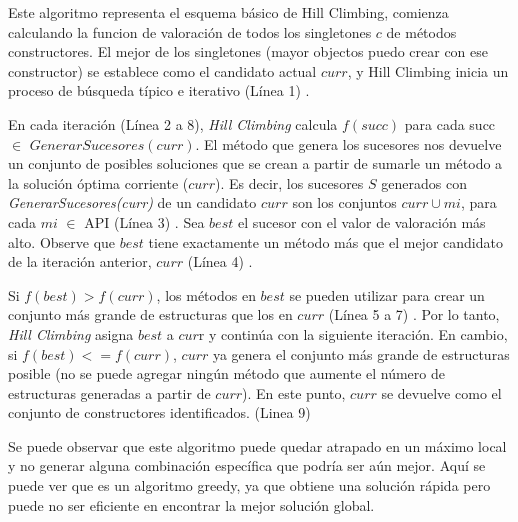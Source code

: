 Este algoritmo representa el esquema básico de Hill Climbing, comienza
calculando la funcion de valoración de todos los singletones ${c}$ de métodos
constructores.  El mejor de los singletones (mayor objectos puedo crear con ese
constructor) se establece como el candidato actual $curr$, y Hill Climbing
inicia un proceso de búsqueda típico e iterativo (Línea 1) .

En cada iteración (Línea 2 a 8), \emph{Hill Climbing} calcula $f(succ)$ para
cada succ $\in$ $GenerarSucesores(curr)$. El método que genera los sucesores nos
devuelve un conjunto de posibles soluciones que se crean a partir de sumarle un
método a la solución óptima corriente ($curr$). Es decir, los sucesores  $S$
generados con \emph{GenerarSucesores(curr)} de un candidato $curr$ son los
conjuntos {$curr\cup{mi}$}, para cada $mi$ $\in$ API (Línea 3) .
Sea $best$ el sucesor con el valor de valoración más alto. Observe que $best$
tiene exactamente un método más que el mejor candidato de la iteración anterior,
$curr$ (Línea 4) .

Si $f(best) > f(curr)$, los métodos en $best$ se pueden utilizar para crear un
conjunto más grande de estructuras que los en $curr$ (Línea 5 a 7) . Por lo tanto, \emph{Hill Climbing} asigna $best$ a $cur$r y continúa con la siguiente iteración. En cambio, si $f(best) <= f(curr)$, $curr$ ya genera el conjunto más grande de estructuras posible (no se puede agregar ningún método que aumente el número de estructuras generadas a partir de $curr$). En este punto, $curr$ se devuelve como el conjunto de constructores identificados. (Linea 9) 


Se puede observar que este algoritmo puede quedar atrapado en un máximo local y
no generar alguna combinación específica que podría ser aún mejor. Aquí se puede
ver que es un algoritmo greedy, ya que obtiene una solución rápida pero puede no
ser eficiente  en encontrar la mejor solución global. 


